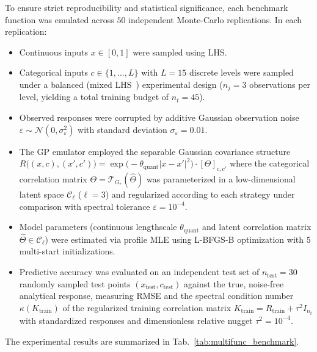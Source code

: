 \documentclass[default,sn-mathphys,Numbered]{sn-jnl}
\theoremstyle{thmstyleone}
\theoremstyle{thmstylethree}
\theoremstyle{thmstyletwo}
\begin{document}
To ensure strict reproducibility and statistical significance, each benchmark function was emulated across $50$ independent Monte-Carlo replications. In each replication:
\begin{itemize}
    \item Continuous inputs $x \in [0, 1]$ were sampled using LHS.
    \item Categorical inputs $c \in \{1, \ldots, L\}$ with $L = 15$ discrete levels were sampled under a balanced (mixed LHS~\citep{bussemaker2025system}) experimental design ($n_j = 3$ observations per level, yielding a total training budget of $n_t = 45$).
    \item Observed responses were corrupted by additive Gaussian observation noise $\varepsilon \sim \mathcal{N}(0, \sigma_{\varepsilon}^2)$ with standard deviation $\sigma_{\varepsilon} = 0.01$.
    \item The GP emulator employed the separable Gaussian covariance structure $R\bigl((x, c), (x', c')\bigr) = \exp\bigl(-\theta_{\mathrm{quant}} |x - x'|^2\bigr) \cdot [\Theta]_{c, c'}$ where the categorical correlation matrix $\Theta = \mathcal{T}_{G_*}(\hat{\Theta})$ was parameterized in a low-dimensional latent space $\mathcal{C}_\ell$ ($\ell = 3$) and regularized according to each strategy under comparison with spectral tolerance $\varepsilon = 10^{-4}$.
    \item Model parameters (continuous lengthscale $\theta_{\mathrm{quant}}$ and latent correlation matrix $\hat{\Theta} \in \mathcal{C}_\ell$) were estimated via profile MLE using L-BFGS-B optimization with $5$ multi-start initializations.
    \item Predictive accuracy was evaluated on an independent test set of $n_{\mathrm{test}} = 30$ randomly sampled test points $(x_{\mathrm{test}}, c_{\mathrm{test}})$ against the true, noise-free analytical response, measuring RMSE and the spectral condition number $\kappa(K_{\mathrm{train}})$ of the regularized training correlation matrix $K_{\mathrm{train}} = R_{\mathrm{train}} + \tau^2 I_{n_t}$ with standardized responses and dimensionless relative nugget $\tau^2 = 10^{-4}$.
\end{itemize}
The experimental results are summarized in Tab.~\ref{tab:multifunc_benchmark}.
\end{document}
